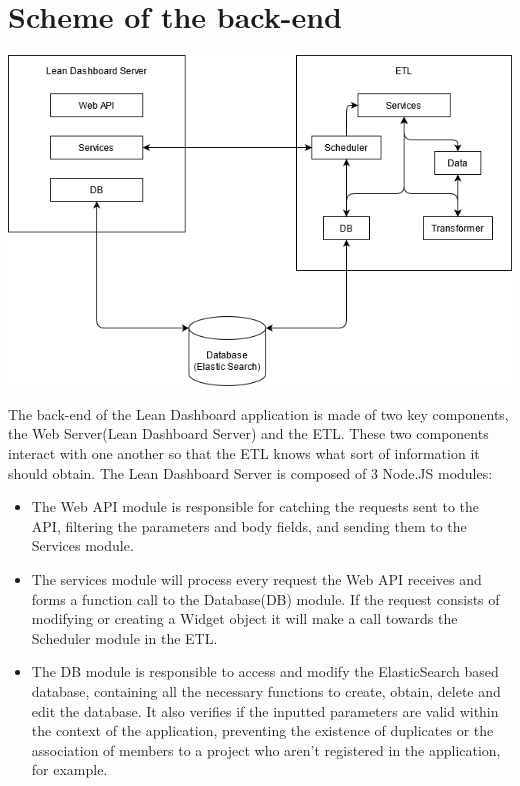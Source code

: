 \documentclass[a4paper,twoside,10pt]{report}
\begin{document}
\section{Scheme of the back-end}
\begin{center}
    \includegraphics[width=\textwidth]{arquitetura software.png}
\end{center}
The back-end of the Lean Dashboard application is made of two key components, the Web Server(Lean Dashboard Server) and the ETL.
\newline
These two components interact with one another so that the ETL knows what sort of information it should obtain.
\newline
The Lean Dashboard Server is composed of 3 Node.JS\cite{NODE} modules:
\begin{itemize}
  \item The Web API module is responsible for catching the requests sent to the API, filtering the parameters and body fields, and sending them to the Services module.
  \item The services module will process every request the Web API receives and forms a function call to the Database(DB) module. If the request consists of modifying or creating a Widget object it will make a call towards the Scheduler module in the ETL.
  \item The DB module is responsible to access and modify the ElasticSearch based database, containing all the necessary functions to create, obtain, delete and edit the database. It also verifies if the inputted parameters are valid within the context of the application, preventing the existence of duplicates or the association of members to a project who aren't registered in the application, for example.
\end{itemize}
\end{document}
